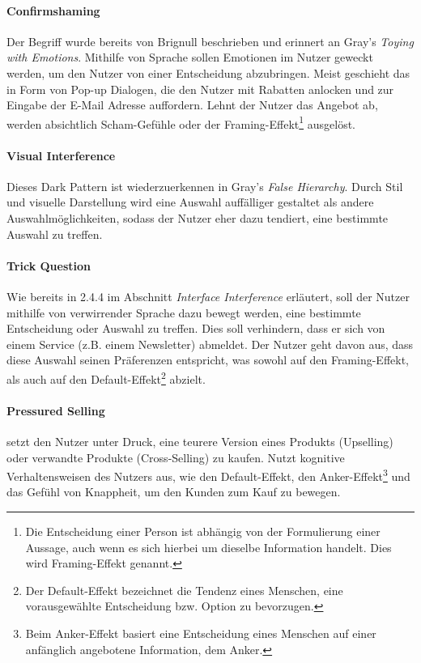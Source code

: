 \documentclass[a4paper]{article}
\begin{document}
\paragraph{Confirmshaming}
Der Begriff wurde bereits von Brignull beschrieben und erinnert an Gray's \textit{Toying with Emotions}. 
Mithilfe von Sprache sollen Emotionen im Nutzer geweckt werden, um den Nutzer von einer Entscheidung abzubringen. Meist geschieht das in Form von Pop-up Dialogen, die den Nutzer mit Rabatten anlocken und zur Eingabe der E-Mail Adresse auffordern. Lehnt der Nutzer das Angebot ab, werden absichtlich Scham-Gefühle oder der Framing-Effekt\footnote{\label{foot:5} Die Entscheidung einer Person ist abhängig von der Formulierung einer Aussage, auch wenn es sich hierbei um dieselbe Information handelt. Dies wird Framing-Effekt genannt.}  ausgelöst.

\paragraph{Visual Interference}
Dieses Dark Pattern ist wiederzuerkennen in Gray's \textit{False Hierarchy}. 
Durch Stil und visuelle Darstellung wird eine Auswahl auffälliger gestaltet als andere Auswahlmöglichkeiten, sodass der Nutzer eher dazu tendiert, eine bestimmte Auswahl zu treffen.

\paragraph{Trick Question}
Wie bereits in 2.4.4 im Abschnitt \textit{Interface Interference} erläutert, soll der Nutzer mithilfe von verwirrender Sprache dazu bewegt werden, eine bestimmte Entscheidung oder Auswahl zu treffen. Dies soll verhindern, dass er sich von einem Service (z.B. einem Newsletter) abmeldet. Der Nutzer geht davon aus, dass diese Auswahl seinen Präferenzen entspricht, was sowohl auf den Framing-Effekt, als auch auf den Default-Effekt\footnote{\label{foot:6} Der Default-Effekt bezeichnet die Tendenz eines Menschen, eine vorausgewählte Entscheidung bzw. Option zu bevorzugen.} abzielt.

\paragraph{Pressured Selling} setzt den Nutzer unter Druck, eine teurere Version eines Produkts (Upselling) oder verwandte Produkte (Cross-Selling) zu kaufen. Nutzt kognitive Verhaltensweisen des Nutzers aus, wie den Default-Effekt, den Anker-Effekt\footnote{\label{foot:7} Beim Anker-Effekt basiert eine Entscheidung eines Menschen auf einer anfänglich angebotene Information, dem \glqq Anker\grqq{}.} und das Gefühl von Knappheit, um den Kunden zum Kauf zu bewegen.
\end{document}

